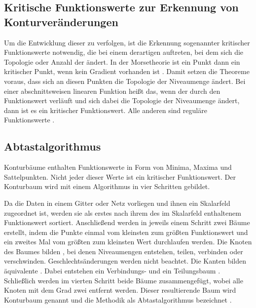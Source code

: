 \subsection*{Kritische Funktionswerte zur Erkennung von Konturveränderungen}
Um die Entwicklung dieser  zu verfolgen, ist die Erkennung sogenannter kritischer Funktionswerte notwendig, die bei einem derartigen  auftreten, bei dem sich die Topologie oder Anzahl der  ändert. In der Morsetheorie ist ein Punkt dann ein kritischer Punkt, wenn kein Gradient vorhanden ist  \cite{milnor1963morse} \cite{shinagawa1991surfaceBasedOnMorse}. Damit setzen die Theoreme voraus, dass sich an diesen Punkten die Topologie der Niveaumenge ändert. Bei einer abschnittsweisen linearen Funktion heißt das, wenn der  durch den Funktionswert verläuft und sich dabei die Topologie der Niveaumenge ändert, dann ist es ein kritischer Funktionswert. Alle anderen sind reguläre Funktionswerte \cite{carr2010flexibleIsosurfaces} \cite{chiang2005contourTreesUsingMonotonePaths}.

\subsection*{Abtastalgorithmus}\label{sec:related:konturAbtast}
Konturbäume enthalten Funktionswerte in Form von Minima, Maxima und Sattelpunkten. Nicht jeder dieser Werte ist ein kritischer Funktionswert. Der Konturbaum wird mit einem Algorithmus in vier Schritten gebildet.

Da die Daten in einem Gitter oder Netz vorliegen und ihnen ein Skalarfeld zugeordnet ist, werden sie als erstes nach ihrem des im Skalarfeld enthaltenem Funktionswert sortiert. Anschließend werden in jeweils einem Schritt zwei Bäume erstellt, indem die Punkte einmal vom kleinsten zum größten Funktionswert und ein zweites Mal vom größten zum kleinsten Wert durchlaufen werden. Die Knoten des Baumes bilden , bei denen Niveaumengen entstehen, teilen, verbinden oder verschwinden. Geschlechtsänderungen werden nicht beachtet. Die Kanten bilden äquivalente . Dabei entstehen ein Verbindungs- und ein Teilungsbaum \cite{carr2001computingCountourTrees_web}. Schließlich werden im vierten Schritt beide Bäume zusammengefügt, wobei alle Knoten mit dem Grad zwei entfernt werden. Dieser resultierende Baum wird Konturbaum genannt und die Methodik als Abtastalgorithmus bezeichnet \cite{carr2001computingCountourTrees} \cite[S.~176]{chiang2005contourTreesUsingMonotonePaths}.

